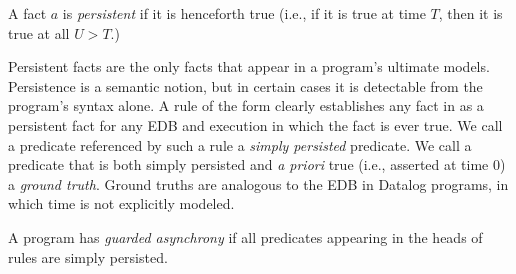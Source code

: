 \begin{definition}

A fact $a$ is  {\em persistent} if it is henceforth true 
(i.e., if it is true at time $T$, then it is true at all $U > T$.)
\end{definition}

Persistent facts are the only facts that appear in a program's ultimate models.
Persistence is a semantic notion, but in certain cases it is detectable from the program's 
syntax alone.  A rule of the form  clearly establishes any fact
in  as a persistent fact for any EDB and execution in which the fact
is ever true. 
We call a predicate referenced by such a rule
a {\em simply persisted} predicate.  
We call a predicate that is both simply persisted and  {\em a priori} true (i.e., asserted
at time 0) a {\em ground truth}.  Ground truths are analogous to the EDB in Datalog programs,
in which time is not explicitly modeled.  


\begin{definition}
A \lang program has {\em guarded asynchrony} if all predicates 
appearing in the heads of  rules
are simply persisted.
\end{definition}



